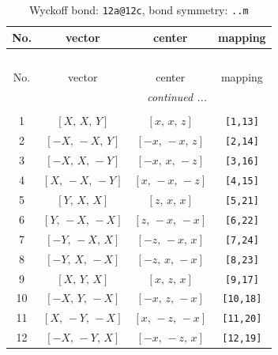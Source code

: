 \documentclass[fleqn,8pt]{jsarticle}
\begin{document}
\begin{longtable}{cccc}
\caption{Wyckoff bond: {\tt 12a@12c}, bond symmetry: {\tt ..m}}
 \\
 \hline \hline
No. & vector & center & mapping \\ \hline \endfirsthead

\multicolumn{3}{l}{\tablename\ \thetable{}} \\
 \hline \hline
No. & vector & center & mapping \\ \hline \endhead

 \hline \hline
\multicolumn{3}{r}{\footnotesize\it continued ...} \\ \endfoot

 \hline \hline
\multicolumn{3}{r}{} \\ \endlastfoot

1 & $\left[ X,\, X,\, Y \right]$ & $\left[ x,\, x,\, z \right]$ & {\tt [1,13]} \\ \hline
2 & $\left[ - X,\, - X,\, Y \right]$ & $\left[ - x,\, - x,\, z \right]$ & {\tt [2,14]} \\ \hline
3 & $\left[ - X,\, X,\, - Y \right]$ & $\left[ - x,\, x,\, - z \right]$ & {\tt [3,16]} \\ \hline
4 & $\left[ X,\, - X,\, - Y \right]$ & $\left[ x,\, - x,\, - z \right]$ & {\tt [4,15]} \\ \hline
5 & $\left[ Y,\, X,\, X \right]$ & $\left[ z,\, x,\, x \right]$ & {\tt [5,21]} \\ \hline
6 & $\left[ Y,\, - X,\, - X \right]$ & $\left[ z,\, - x,\, - x \right]$ & {\tt [6,22]} \\ \hline
7 & $\left[ - Y,\, - X,\, X \right]$ & $\left[ - z,\, - x,\, x \right]$ & {\tt [7,24]} \\ \hline
8 & $\left[ - Y,\, X,\, - X \right]$ & $\left[ - z,\, x,\, - x \right]$ & {\tt [8,23]} \\ \hline
9 & $\left[ X,\, Y,\, X \right]$ & $\left[ x,\, z,\, x \right]$ & {\tt [9,17]} \\ \hline
10 & $\left[ - X,\, Y,\, - X \right]$ & $\left[ - x,\, z,\, - x \right]$ & {\tt [10,18]} \\ \hline
11 & $\left[ X,\, - Y,\, - X \right]$ & $\left[ x,\, - z,\, - x \right]$ & {\tt [11,20]} \\ \hline
12 & $\left[ - X,\, - Y,\, X \right]$ & $\left[ - x,\, - z,\, x \right]$ & {\tt [12,19]} \\
\end{longtable}
\renewcommand{\arraystretch}{1.2}
\end{document}
